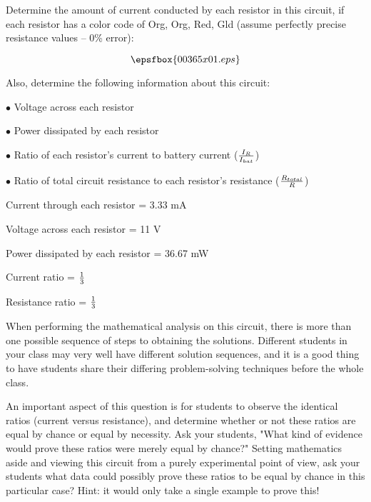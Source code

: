 

Determine the amount of current conducted by each resistor in this circuit, if each resistor has a color code of Org, Org, Red, Gld (assume perfectly precise resistance values -- 0\% error):

$$\epsfbox{00365x01.eps}$$

Also, determine the following information about this circuit:

\medskip
\item{$\bullet$} Voltage across each resistor 
\item{$\bullet$} Power dissipated by each resistor
\item{$\bullet$} Ratio of each resistor's current to battery current ($I_R \over I_{bat}$)
\item{$\bullet$} Ratio of total circuit resistance to each resistor's resistance ($R_{total} \over R$)
\medskip







Current through each resistor = 3.33 mA

Voltage across each resistor = 11 V

Power dissipated by each resistor = 36.67 mW

Current ratio = $1 \over 3$

Resistance ratio = $1 \over 3$







When performing the mathematical analysis on this circuit, there is more than one possible sequence of steps to obtaining the solutions.  Different students in your class may very well have different solution sequences, and it is a good thing to have students share their differing problem-solving techniques before the whole class.

An important aspect of this question is for students to observe the identical ratios (current versus resistance), and determine whether or not these ratios are equal by chance or equal by necessity.  Ask your students, "What kind of evidence would prove these ratios were merely equal by chance?"  Setting mathematics aside and viewing this circuit from a purely experimental point of view, ask your students what data could possibly prove these ratios to be equal by chance in this particular case?  Hint: it would only take a single example to prove this!




